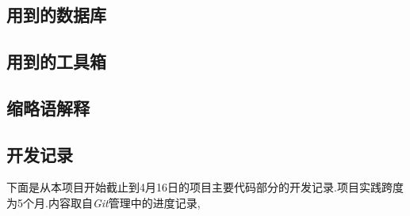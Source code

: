 \chapter{}
\section{用到的数据库}
\section{用到的工具箱}
\section{缩略语解释}
\section{开发记录}
下面是从本项目开始截止到4月16日的项目主要代码部分的开发记录.项目实践跨度为5个月.内容取自\textit{Git}管理中的进度记录,




\listoftables
{}%
\listoffigures%

